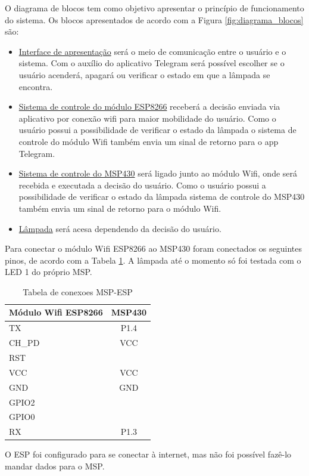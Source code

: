 \documentclass[12pt,journal,compsoc]{IEEEtran}
\begin{document}
O diagrama de blocos tem como objetivo apresentar o princípio de funcionamento do sistema. Os blocos apresentados de acordo com a Figura \ref{fig:diagrama_blocos} são:


\begin{itemize}
\item \underline{Interface de apresentação} será o meio de comunicação entre o usuário e o sistema. Com o auxílio do aplicativo Telegram será possível escolher se o usuário acenderá, apagará ou verificar o estado em que a lâmpada se encontra.
\item \underline{Sistema de controle do módulo ESP8266} receberá a decisão enviada via aplicativo por conexão wifi para maior mobilidade do usuário. Como o usuário possui a possibilidade de verificar o estado da lâmpada o sistema de controle do módulo Wifi também envia um sinal de retorno para o app Telegram.
\item \underline{Sistema de controle do MSP430} será ligado junto ao módulo Wifi, onde será recebida e executada a decisão do usuário. Como o usuário possui a possibilidade de verificar o estado da lâmpada sistema de controle do MSP430 também envia um sinal de retorno para o módulo Wifi.
\item \underline{Lâmpada} será acesa dependendo da decisão do usuário.
\end{itemize}

Para conectar o módulo Wifi ESP8266 ao MSP430 foram conectados os seguintes pinos, de acordo com a Tabela \ref{tab:conexoes}. A lâmpada até o momento só foi testada com o LED 1 do próprio MSP.

\begin{table}[h!]
\centering
\caption{Tabela de conexoes MSP-ESP}
\label{tab:conexoes}
\begin{tabular}{|l|c|}
\hline
Módulo Wifi ESP8266 & MSP430 \\ \hline
TX & P1.4 \\ \hline
CH\_PD & VCC \\ \hline
RST &  \\ \hline
VCC & VCC \\ \hline
GND & GND \\ \hline
GPIO2 & \\ \hline
GPIO0 & \\ \hline
RX & P1.3 \\ \hline
\end{tabular}
\end{table}

O ESP foi configurado para se conectar à internet, mas não foi possível fazê-lo mandar dados para o MSP.
\end{document}
